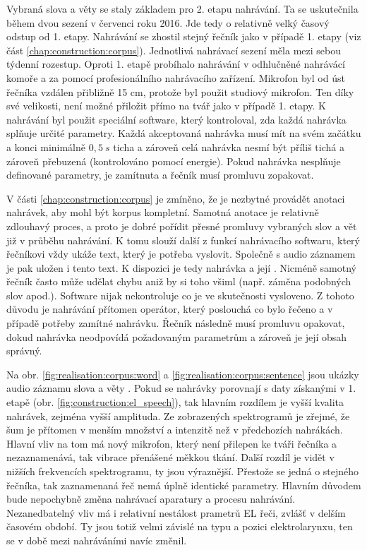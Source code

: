 Vybraná slova a věty se staly základem pro 2. etapu nahrávání. Ta se uskutečnila během dvou sezení v červenci roku 2016. Jde tedy o relativně velký časový odstup od 1. etapy. Nahrávání se zhostil stejný řečník jako v případě 1. etapy (viz část \ref{chap:construction:corpus}). Jednotlivá nahrávací sezení měla mezi sebou týdenní rozestup. Oproti 1. etapě probíhalo nahrávání v odhlučněné nahrávácí komoře a za pomocí profesionálního nahrávacího zařízení. Mikrofon byl od úst řečníka vzdálen přibližně 15 cm, protože byl použit studiový mikrofon. Ten díky své velikosti, není možné přiložit přímo na tvář jako v případě 1. etapy. K nahrávání byl použit speciální software, který kontroloval, zda každá nahrávka splňuje určité parametry. Každá akceptovaná nahrávka musí mít na svém začátku a konci minimálně $0,5\ s$ ticha a zároveň celá nahrávka nesmí být příliš tichá a zároveň přebuzená (kontrolováno pomocí energie). Pokud nahrávka nesplňuje definované parametry, je zamítnuta a řečník musí promluvu zopakovat.

V části \ref{chap:construction:corpus} je zmíněno, že je nezbytné provádět anotaci nahrávek, aby mohl být korpus kompletní. Samotná anotace je  relativně zdlouhavý proces, a proto je dobré pořídit přesné promluvy vybraných slov a vět již v průběhu nahrávání. K tomu slouží další z funkcí nahrávacího softwaru, který řečníkovi vždy ukáže text, který je potřeba vyslovit. Společně s audio záznamem je pak uložen i tento text. K dispozici je tedy nahrávka a její . Nicméně samotný řečník často může udělat chybu aniž by si toho všiml (např. záměna podobných slov apod.). Software nijak nekontroluje co je ve skutečnosti vysloveno. Z tohoto důvodu je nahrávání přítomen operátor, který poslouchá co bylo řečeno a v případě potřeby zamítné nahrávku. Řečník následně musí promluvu opakovat, dokud nahrávka neodpovídá požadovaným parametrům a zároveň je její obsah správný.

Na obr. \ref{fig:realisation:corpus:word} a \ref{fig:realisation:corpus:sentence} jsou ukázky audio záznamu slova  a věty . Pokud se nahrávky porovnají s daty získanými v 1. etapě (obr. \ref{fig:construction:el_speech}), tak hlavním rozdílem je vyšší kvalita nahrávek, zejména vyšší amplituda. Ze zobrazených spektrogramů je zřejmé, že šum je přítomen v menším množství a intenzitě než v předchozích nahrákách. Hlavní vliv na tom má nový mikrofon, který není přilepen ke tváři řečníka a nezaznamenává, tak vibrace přenášené měkkou tkání. Další rozdíl je vidět v nižších frekvencích spektrogramu, ty jsou výraznější. Přestože se jedná o stejného řečníka, tak zaznamenaná řeč nemá úplně identické parametry. Hlavním důvodem bude nepochybně změna nahrávací aparatury a procesu nahrávání. Nezanedbatelný vliv má i relativní nestálost prametrů EL řeči, zvlášť v delším časovém období. Ty jsou totiž velmi závislé na typu a pozici elektrolarynxu, ten se v době mezi nahráváními navíc změnil.

